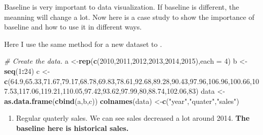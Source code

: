 \documentclass[]{book}
\newenvironment{Shaded}{\begin{snugshade}}{\end{snugshade}}
\newcommand{\KeywordTok}[1]{\textcolor[rgb]{0.13,0.29,0.53}{\textbf{#1}}}
\newcommand{\DataTypeTok}[1]{\textcolor[rgb]{0.13,0.29,0.53}{#1}}
\newcommand{\DecValTok}[1]{\textcolor[rgb]{0.00,0.00,0.81}{#1}}
\newcommand{\FloatTok}[1]{\textcolor[rgb]{0.00,0.00,0.81}{#1}}
\newcommand{\StringTok}[1]{\textcolor[rgb]{0.31,0.60,0.02}{#1}}
\newcommand{\CommentTok}[1]{\textcolor[rgb]{0.56,0.35,0.01}{\textit{#1}}}
\newcommand{\OperatorTok}[1]{\textcolor[rgb]{0.81,0.36,0.00}{\textbf{#1}}}
\newcommand{\NormalTok}[1]{#1}
\providecommand{\tightlist}{%
  \setlength{\itemsep}{0pt}\setlength{\parskip}{0pt}}
\theoremstyle{definition}
\theoremstyle{definition}
\theoremstyle{definition}
\theoremstyle{remark}
\begin{document}
Baseline is very important to data visualization. If baseline is
different, the meanning will change a lot. Now here is a case study to
show the importance of baseline and how to use it in different ways.

Here I use the same method for a new dataset to .

\begin{Shaded}
\begin{Highlighting}[]
\CommentTok{# Create the data.}
\NormalTok{a <-}\KeywordTok{rep}\NormalTok{(}\KeywordTok{c}\NormalTok{(}\DecValTok{2010}\NormalTok{,}\DecValTok{2011}\NormalTok{,}\DecValTok{2012}\NormalTok{,}\DecValTok{2013}\NormalTok{,}\DecValTok{2014}\NormalTok{,}\DecValTok{2015}\NormalTok{),}\DataTypeTok{each =} \DecValTok{4}\NormalTok{)}
\NormalTok{b <-}\StringTok{ }\KeywordTok{seq}\NormalTok{(}\DecValTok{1}\OperatorTok{:}\DecValTok{24}\NormalTok{)}
\NormalTok{c <-}\StringTok{ }\KeywordTok{c}\NormalTok{(}\FloatTok{64.9}\NormalTok{,}\FloatTok{65.33}\NormalTok{,}\FloatTok{71.67}\NormalTok{,}\FloatTok{79.17}\NormalTok{,}\FloatTok{68.78}\NormalTok{,}\FloatTok{69.83}\NormalTok{,}\FloatTok{78.61}\NormalTok{,}\FloatTok{92.68}\NormalTok{,}\FloatTok{89.28}\NormalTok{,}\FloatTok{90.43}\NormalTok{,}\FloatTok{97.96}\NormalTok{,}\FloatTok{106.96}\NormalTok{,}\FloatTok{100.66}\NormalTok{,}\FloatTok{107.53}\NormalTok{,}\FloatTok{117.06}\NormalTok{,}\FloatTok{119.21}\NormalTok{,}\FloatTok{110.05}\NormalTok{,}\FloatTok{97.42}\NormalTok{,}\FloatTok{93.62}\NormalTok{,}\FloatTok{97.99}\NormalTok{,}\DecValTok{80}\NormalTok{,}\FloatTok{88.74}\NormalTok{,}\FloatTok{102.06}\NormalTok{,}\DecValTok{83}\NormalTok{)}
\NormalTok{data <-}\StringTok{ }\KeywordTok{as.data.frame}\NormalTok{(}\KeywordTok{cbind}\NormalTok{(a,b,c))}
\KeywordTok{colnames}\NormalTok{(data) <-}\KeywordTok{c}\NormalTok{(}\StringTok{"year"}\NormalTok{,}\StringTok{"quater"}\NormalTok{,}\StringTok{"sales"}\NormalTok{)}
\end{Highlighting}
\end{Shaded}

\begin{enumerate}
\def\labelenumi{\arabic{enumi}.}
\tightlist
\item
  Regular quaterly sales. We can see sales decreased a lot around 2014.
  \textbf{The baseline here is historical sales.}
\end{enumerate}

\begin{Shaded}
\end{Shaded}
\end{document}
